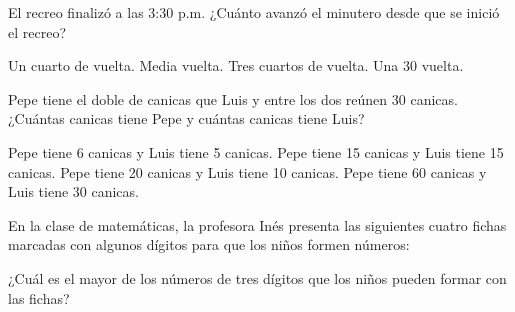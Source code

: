 \documentclass[10pt,letterpaper,addpoints]{exam}
\begin{document}
\begin{multicols}{2}
\begin{questions}
\question El recreo finalizó a las 3:30 p.m. ¿Cuánto avanzó el minutero desde que se inició el recreo?
\begin{choices}
\choice Un cuarto de vuelta.
\CorrectChoice Media vuelta.
\choice Tres cuartos de vuelta.
\choice Una 30 vuelta.
\end{choices}
\question Pepe tiene el doble de canicas que Luis y entre los dos reúnen 30 canicas. ¿Cuántas canicas tiene Pepe y cuántas canicas tiene Luis?
\begin{choices}
\choice Pepe tiene 6 canicas y Luis tiene 5 canicas.
\choice Pepe tiene 15 canicas y Luis tiene 15 canicas.
\CorrectChoice Pepe tiene 20 canicas y Luis tiene 10 canicas.
\choice Pepe tiene 60 canicas y Luis tiene 30 canicas.
\end{choices}
\question En la clase de matemáticas, la profesora Inés presenta las siguientes cuatro fichas marcadas con algunos dígitos para que los niños formen números:
\begin{center}
\end{center}
¿Cuál es el mayor de los números de tres dígitos que los niños pueden formar con las fichas?
\begin{multicols}{2}
\begin{choices}
\end{choices}
\end{multicols}
\end{questions}
\end{multicols}
\end{document}

